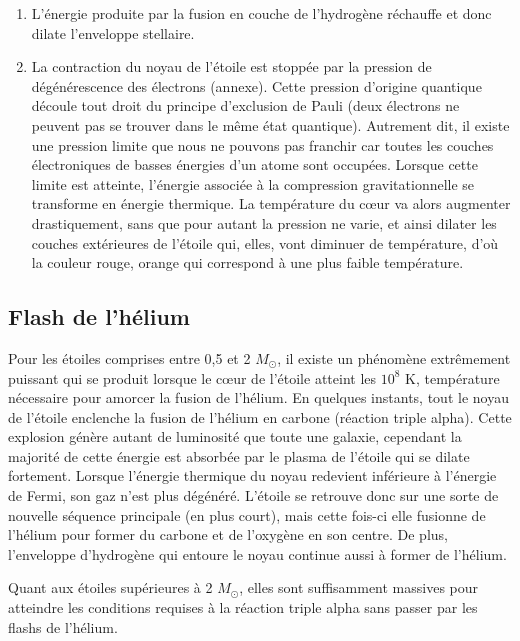 \begin{enumerate}
	\item L’énergie produite par la fusion en couche de l’hydrogène réchauffe et donc dilate l’enveloppe stellaire.
	\item La contraction du noyau de l’étoile est stoppée par la pression de dégénérescence des électrons (annexe). Cette pression d’origine quantique découle tout droit du principe d’exclusion de Pauli (deux électrons ne peuvent pas se trouver dans le même état quantique). Autrement dit, il existe une pression limite que nous ne pouvons pas franchir car toutes les couches électroniques de basses énergies d’un atome sont occupées. Lorsque cette limite est atteinte, l’énergie associée à la compression gravitationnelle se transforme en énergie thermique. La température du cœur va alors augmenter drastiquement, sans que pour autant la pression ne varie, et ainsi dilater les couches extérieures de l’étoile qui, elles, vont diminuer de température, d’où la couleur rouge, orange qui correspond à une plus faible température. 
	
\end{enumerate}

\subsection{Flash de l'hélium}\label{2.2.1}

Pour les étoiles comprises entre 0,5 et 2 $M_\odot$, il existe un phénomène extrêmement puissant qui se produit lorsque le cœur de l’étoile atteint les $10^{8}$ K, température nécessaire pour amorcer la fusion de l’hélium. En quelques instants, tout le noyau de l’étoile enclenche la fusion de l’hélium en carbone (réaction triple alpha). Cette explosion génère autant de luminosité que toute une galaxie, cependant la majorité de cette énergie est absorbée par le plasma de l’étoile qui se dilate fortement. Lorsque l’énergie thermique du noyau redevient inférieure à l’énergie de Fermi, son gaz n’est plus dégénéré. L’étoile se retrouve donc sur une sorte de nouvelle séquence principale (en plus court), mais cette fois-ci elle fusionne de l’hélium pour former du carbone et de l’oxygène en son centre. De plus, l’enveloppe d’hydrogène qui entoure le noyau continue aussi à former de l’hélium.\smallskip

Quant aux étoiles supérieures à 2 $M_\odot$, elles sont suffisamment massives pour atteindre les conditions requises à la réaction triple alpha sans passer par les flashs de l’hélium.\newpage

